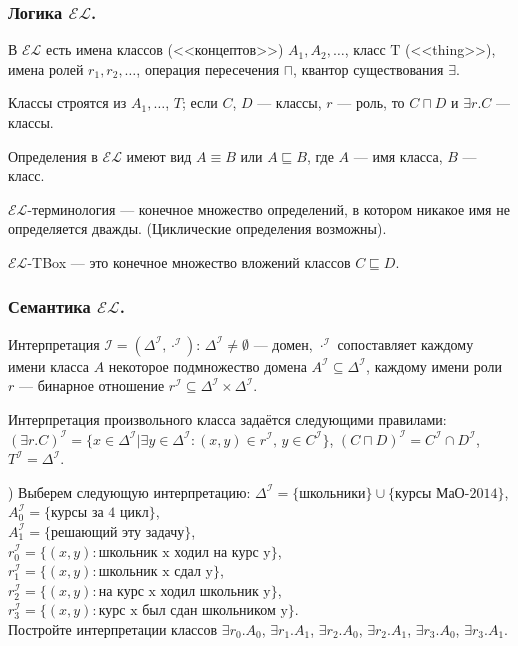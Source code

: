 \documentclass[12pt]{article}
\begin{document}
\subsubsection*{Логика $\mathcal{EL}$.}
В $\mathcal{EL}$ есть имена классов (<<концептов>>) $A_1, A_2, \dots$, класс $\mathrm T$ (<<thing>>),
имена ролей $r_1, r_2, \dots$, операция пересечения $\sqcap$, квантор существования $\exists$.

Классы строятся из $A_1,\dots$, $T$;
если $C$, $D$ --- классы, $r$ --- роль, то $C\sqcap D$ и $\exists r.C$ --- классы.

Определения в $\mathcal{EL}$ имеют вид $A\equiv B$ или $A\sqsubseteq B$,
где $A$ --- имя класса, $B$ --- класс.

$\mathcal{EL}$-терминология --- конечное множество определений,
в котором никакое имя не определяется дважды.
(Циклические определения возможны).

$\mathcal{EL}$-TBox --- это конечное множество вложений классов $C\sqsubseteq D$.


\subsubsection*{Семантика $\mathcal{EL}$.}
Интерпретация $\mathcal{I} = (\Delta^\mathcal{I}, \cdot^\mathcal{I})$:
$\Delta^\mathcal{I} \neq \emptyset$ --- домен,
$\cdot^\mathcal{I}$ сопоставляет каждому имени класса $A$
некоторое подмножество домена $A^\mathcal{I} \subseteq \Delta^\mathcal{I}$,
каждому имени роли $r$ --- бинарное отношение
$r^\mathcal{I} \subseteq \Delta^\mathcal{I} \times \Delta^\mathcal{I}$.

Интерпретация произвольного класса задаётся следующими правилами:
$(\exists r.C)^\mathcal{I} =
\{ x\in\Delta^\mathcal{I} | \exists y\in\Delta^\mathcal{I}
  \colon 
(x,y) \in r^\mathcal{I}, \, y\in C^\mathcal{I} \}$,
$(C\sqcap D)^\mathcal{I} = C^\mathcal{I} \cap D^\mathcal{I}$,
$T^\mathcal{I} = \Delta^\mathcal{I}$.

{\z) Выберем следующую интерпретацию:
$\Delta^\mathcal{I} = \{\mbox{школьники}\} \cup \{\mbox{курсы МаО-}2014\}$, \\
$A_0^\mathcal{I} = \{\mbox{курсы за 4 цикл}\}$, \\
$A_1^\mathcal{I} = \{\mbox{решающий эту задачу}\}$, \\
$r_0^\mathcal{I} = \{(x,y)\colon \mbox{школьник x ходил на курс y}\}$, \\
$r_1^\mathcal{I} = \{(x,y)\colon \mbox{школьник x сдал y}\}$, \\
$r_2^\mathcal{I} = \{(x,y)\colon \mbox{на курс x ходил школьник y}\}$, \\
$r_3^\mathcal{I} = \{(x,y)\colon \mbox{курс x был сдан школьником y}\}$. \\
Постройте интерпретации классов $\exists r_0.A_0$, $\exists r_1.A_1$, $\exists r_2.A_0$,
$\exists r_2.A_1$, $\exists r_3.A_0$, $\exists r_3.A_1$.
}
\end{document}
